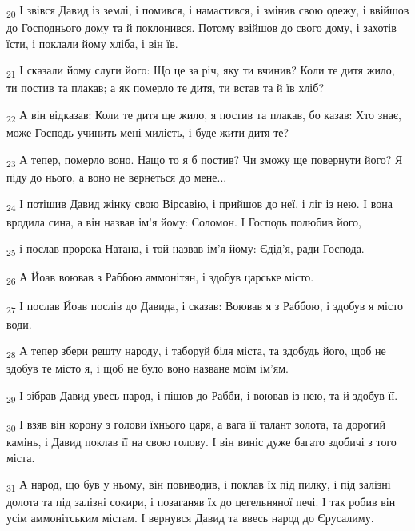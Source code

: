 \begin{tcolorbox}
\textsubscript{20} І звівся Давид із землі, і помився, і намастився, і змінив свою одежу, і ввійшов до Господнього дому та й поклонився. Потому ввійшов до свого дому, і захотів їсти, і поклали йому хліба, і він їв.
\end{tcolorbox}
\begin{tcolorbox}
\textsubscript{21} І сказали йому слуги його: Що це за річ, яку ти вчинив? Коли те дитя жило, ти постив та плакав; а як померло те дитя, ти встав та й їв хліб?
\end{tcolorbox}
\begin{tcolorbox}
\textsubscript{22} А він відказав: Коли те дитя ще жило, я постив та плакав, бо казав: Хто знає, може Господь учинить мені милість, і буде жити дитя те?
\end{tcolorbox}
\begin{tcolorbox}
\textsubscript{23} А тепер, померло воно. Нащо то я б постив? Чи зможу ще повернути його? Я піду до нього, а воно не вернеться до мене...
\end{tcolorbox}
\begin{tcolorbox}
\textsubscript{24} І потішив Давид жінку свою Вірсавію, і прийшов до неї, і ліг із нею. І вона вродила сина, а він назвав ім'я йому: Соломон. І Господь полюбив його,
\end{tcolorbox}
\begin{tcolorbox}
\textsubscript{25} і послав пророка Натана, і той назвав ім'я йому: Єдід'я, ради Господа.
\end{tcolorbox}
\begin{tcolorbox}
\textsubscript{26} А Йоав воював з Раббою аммонітян, і здобув царське місто.
\end{tcolorbox}
\begin{tcolorbox}
\textsubscript{27} І послав Йоав послів до Давида, і сказав: Воював я з Раббою, і здобув я місто води.
\end{tcolorbox}
\begin{tcolorbox}
\textsubscript{28} А тепер збери решту народу, і таборуй біля міста, та здобудь його, щоб не здобув те місто я, і щоб не було воно назване моїм ім'ям.
\end{tcolorbox}
\begin{tcolorbox}
\textsubscript{29} І зібрав Давид увесь народ, і пішов до Рабби, і воював із нею, та й здобув її.
\end{tcolorbox}
\begin{tcolorbox}
\textsubscript{30} І взяв він корону з голови їхнього царя, а вага її талант золота, та дорогий камінь, і Давид поклав її на свою голову. І він виніс дуже багато здобичі з того міста.
\end{tcolorbox}
\begin{tcolorbox}
\textsubscript{31} А народ, що був у ньому, він повиводив, і поклав їх під пилку, і під залізні долота та під залізні сокири, і позаганяв їх до цегельняної печі. І так робив він усім аммонітським містам. І вернувся Давид та ввесь народ до Єрусалиму.
\end{tcolorbox}
